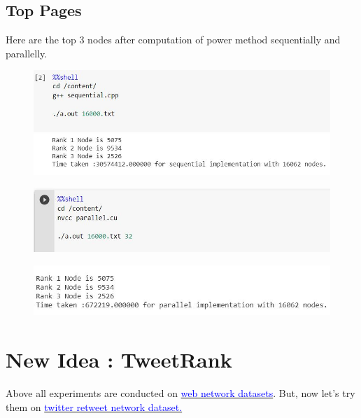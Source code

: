 \documentclass[a4paper]{article}
\begin{document}
\subsection{Top Pages}
Here are the top 3 nodes after computation of power method sequentially and parallelly.
\begin{figure}[h]
    \begin{center}
    \includegraphics[width=1\textwidth]{PageRank/img/Capture3.JPG}
    \end{center}
\end{figure}
\begin{figure}[h]
    \begin{center}
    \includegraphics[width=1\textwidth]{PageRank/img/Capture4.JPG}
    \end{center}
\end{figure}
\begin{figure}[h]
    \begin{center}
    \includegraphics[width=1\textwidth]{PageRank/img/Capture5.JPG}
    \end{center}
\end{figure}

\section{New Idea : TweetRank}
Above all experiments are conducted on \href{http://networkrepository.com/web.php}{\textcolor{blue}{web network datasets}}. But, now let's try them on \href{http://networkrepository.com/rt-pol.php}{\textcolor{blue}{twitter retweet network dataset.}} \\
\end{document}
